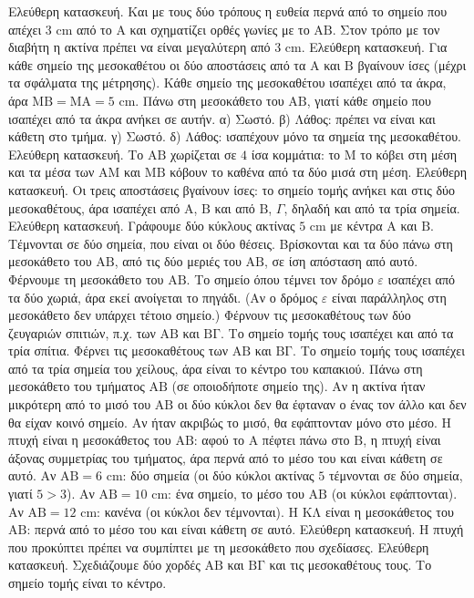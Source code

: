  Ελεύθερη κατασκευή. Και με τους δύο τρόπους η ευθεία περνά από το σημείο που απέχει $3$ cm από το $\mathrm{Α}$ και σχηματίζει ορθές γωνίες με το $\mathrm{ΑΒ}$. Στον τρόπο με τον διαβήτη η ακτίνα πρέπει να είναι μεγαλύτερη από $3$ cm.
 Ελεύθερη κατασκευή. Για κάθε σημείο της μεσοκαθέτου οι δύο αποστάσεις από τα $\mathrm{Α}$ και $\mathrm{Β}$ βγαίνουν ίσες (μέχρι τα σφάλματα της μέτρησης).
 Κάθε σημείο της μεσοκαθέτου ισαπέχει από τα άκρα, άρα $\mathrm{ΜΒ}=\mathrm{ΜΑ}=5$ cm.
 Πάνω στη μεσοκάθετο του $\mathrm{ΑΒ}$, γιατί κάθε σημείο που ισαπέχει από τα άκρα ανήκει σε αυτήν.
 α) Σωστό. β) Λάθος: πρέπει να είναι και κάθετη στο τμήμα. γ) Σωστό. δ) Λάθος: ισαπέχουν μόνο τα σημεία της μεσοκαθέτου.
 Ελεύθερη κατασκευή. Το $\mathrm{ΑΒ}$ χωρίζεται σε $4$ ίσα κομμάτια: το $\mathrm{Μ}$ το κόβει στη μέση και τα μέσα των $\mathrm{ΑΜ}$ και $\mathrm{ΜΒ}$ κόβουν το καθένα από τα δύο μισά στη μέση.
 Ελεύθερη κατασκευή. Οι τρεις αποστάσεις βγαίνουν ίσες: το σημείο τομής ανήκει και στις δύο μεσοκαθέτους, άρα ισαπέχει από $\mathrm{Α}$, $\mathrm{Β}$ και από $\mathrm{Β}$, $\Gamma$, δηλαδή και από τα τρία σημεία.
 Ελεύθερη κατασκευή. Γράφουμε δύο κύκλους ακτίνας $5$ cm με κέντρα $\mathrm{Α}$ και $\mathrm{Β}$. Τέμνονται σε δύο σημεία, που είναι οι δύο θέσεις. Βρίσκονται και τα δύο πάνω στη μεσοκάθετο του $\mathrm{ΑΒ}$, από τις δύο μεριές του $\mathrm{ΑΒ}$, σε ίση απόσταση από αυτό.
 Φέρνουμε τη μεσοκάθετο του $\mathrm{ΑΒ}$. Το σημείο όπου τέμνει τον δρόμο $\varepsilon$ ισαπέχει από τα δύο χωριά, άρα εκεί ανοίγεται το πηγάδι. (Αν ο δρόμος $\varepsilon$ είναι παράλληλος στη μεσοκάθετο δεν υπάρχει τέτοιο σημείο.)
 Φέρνουν τις μεσοκαθέτους των δύο ζευγαριών σπιτιών, π.χ. των $\mathrm{ΑΒ}$ και $\mathrm{ΒΓ}$. Το σημείο τομής τους ισαπέχει και από τα τρία σπίτια.
 Φέρνει τις μεσοκαθέτους των $\mathrm{ΑΒ}$ και $\mathrm{ΒΓ}$. Το σημείο τομής τους ισαπέχει από τα τρία σημεία του χείλους, άρα είναι το κέντρο του καπακιού.
 Πάνω στη μεσοκάθετο του τμήματος $\mathrm{ΑΒ}$ (σε οποιοδήποτε σημείο της).
 Αν η ακτίνα ήταν μικρότερη από το μισό του $\mathrm{ΑΒ}$ οι δύο κύκλοι δεν θα έφταναν ο ένας τον άλλο και δεν θα είχαν κοινό σημείο. Αν ήταν ακριβώς το μισό, θα εφάπτονταν μόνο στο μέσο.
 Η πτυχή είναι η μεσοκάθετος του $\mathrm{ΑΒ}$: αφού το $\mathrm{Α}$ πέφτει πάνω στο $\mathrm{Β}$, η πτυχή είναι άξονας συμμετρίας του τμήματος, άρα περνά από το μέσο του και είναι κάθετη σε αυτό.
 Αν $\mathrm{ΑΒ}=6$ cm: δύο σημεία (οι δύο κύκλοι ακτίνας $5$ τέμνονται σε δύο σημεία, γιατί $5>3$). Αν $\mathrm{ΑΒ}=10$ cm: ένα σημείο, το μέσο του $\mathrm{ΑΒ}$ (οι κύκλοι εφάπτονται). Αν $\mathrm{ΑΒ}=12$ cm: κανένα (οι κύκλοι δεν τέμνονται).
 Η $\mathrm{ΚΛ}$ είναι η μεσοκάθετος του $\mathrm{ΑΒ}$: περνά από το μέσο του και είναι κάθετη σε αυτό.
 Ελεύθερη κατασκευή. Η πτυχή που προκύπτει πρέπει να συμπίπτει με τη μεσοκάθετο που σχεδίασες.
 Ελεύθερη κατασκευή. Σχεδιάζουμε δύο χορδές $\mathrm{ΑΒ}$ και $\mathrm{ΒΓ}$ και τις μεσοκαθέτους τους. Το σημείο τομής είναι το κέντρο.
